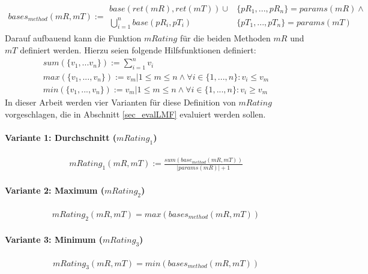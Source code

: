 \begin{gather*}
\mathit{bases_{method}(mR,mT)} := \begin{array}{l|l}
\mathit{base(ret(mR), ret(mT))} \cup \mathit{ }
&
\{\mathit{pR_1,...,pR_n}\} = \mathit{params(mR)} \wedge \mathit{ }
\\
\bigcup\limits_{i=1}^{n} \mathit{base(pR_i,pT_i)}
&
\{\mathit{pT_1,...,pT_n}\} = \mathit{params(mT)}
\end{array} 
\end{gather*}
\noindent
Darauf aufbauend kann die Funktion $\mathit{mRating}$ für die beiden Methoden $\mathit{mR}$ und $\mathit{mT}$ definiert werden. Hierzu seien folgende Hilfsfunktionen definiert:
\begin{gather*}
\mathit{sum(\{v_1,...v_n\})} := \sum_{i=1}^{n}v_i
\\
\mathit{max(\{v_1,...,v_n\})} := v_{m}| 1 \leq m \leq n  \wedge \forall i \in  \{1,...,n\}: v_i \leq v_{m}
\\    
\mathit{min(\{v_1,...,v_n\})} := v_{m}| 1 \leq m \leq n  \wedge \forall i \in  \{1,...,n\}: v_i \geq v_{m}   
\end{gather*}
\noindent
In dieser Arbeit werden vier Varianten für diese Definition von $\mathit{mRating}$ vorgeschlagen, die in Abschnitt \ref{sec_evalLMF} evaluiert werden sollen.
\paragraph{Variante 1: Durchschnitt ($\mathit{mRating}_1$)}

\begin{gather*}
\mathit{mRating_1(mR,mT)} := \frac{\mathit{sum(base_{method}(mR,mT))}}{|\mathit{params(mR)}|+1}
\end{gather*}

\paragraph{Variante 2: Maximum ($\mathit{mRating}_2$)}

\begin{gather*}
\mathit{mRating_2(mR,mT)} = \mathit{max(bases_{method}(mR,mT))}
\end{gather*}

\paragraph{Variante 3: Minimum ($\mathit{mRating}_3$)}

\begin{gather*}
\mathit{mRating_3(mR,mT)} = \mathit{min(bases_{method}(mR,mT))}
\end{gather*}

